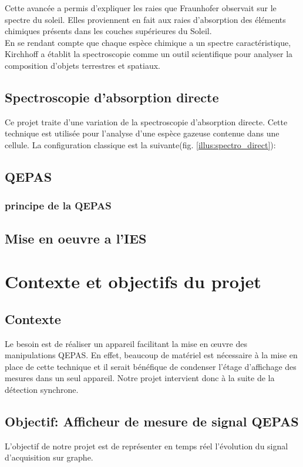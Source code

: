 \documentclass[a4paper]{report}
\begin{document}
	Cette avancée a permis d'expliquer les raies que Fraunhofer observait sur le spectre du soleil. Elles proviennent en fait aux raies d'absorption des éléments chimiques présents dans les couches supérieures du Soleil.\\
	En se rendant compte que chaque espèce chimique a un spectre caractéristique, Kirchhoff a établit la spectroscopie comme un outil scientifique pour analyser la composition d'objets terrestres et spatiaux.
	\section{Spectroscopie d'absorption directe}
	Ce projet traite d'une variation de la spectroscopie d'absorption directe. Cette technique est utilisée pour l'analyse d'une espèce gazeuse contenue dans une cellule. La configuration classique est la suivante(fig. \ref{illus:spectro_direct}):
	
	\section{QEPAS}
		\subsection{principe de la QEPAS}
			
	\section{Mise en oeuvre a l'IES}

	\chapter{Contexte et objectifs du projet}

	
	\section{Contexte}
	Le besoin est de réaliser un appareil facilitant la mise en œuvre des manipulations QEPAS. En effet, beaucoup de matériel est nécessaire à la mise en place de cette technique et il serait bénéfique de condenser l'étage d'affichage des mesures dans un seul appareil.
	Notre projet intervient donc à la suite de la détection synchrone.
	
	\section{Objectif: Afficheur de mesure de signal QEPAS}
	L'objectif de notre projet est de représenter en temps réel l'évolution du signal d'acquisition sur graphe.
	
\end{document}
